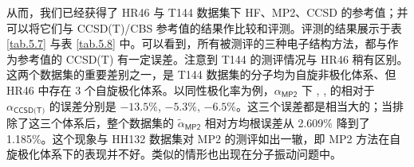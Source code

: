 \begin{table}[!th]
\centering
\caption[HF、MP2、CCSD 方法异性极化率的测评]{HF、MP2、CCSD 方法异性极化率的测评\textrm{\textsuperscript{\emph{a}}}。误差以相对方均根误差统计。}
\label{tab.5.8}
\end{table}

从而，我们已经获得了 HR46 与 T144 数据集下 HF、MP2、CCSD 的参考值；并可以将它们与 CCSD(T)/CBS 参考值的结果作比较和评测。评测的结果展示于表 \ref{tab.5.7} 与表 \ref{tab.5.8} 中。可以看到，所有被测评的三种电子结构方法，都与作为参考值的 CCSD(T) 有一定误差。注意到 T144 的测评情况与 HR46 稍有区别。这两个数据集的重要差别之一，是 T144 数据集的分子均为自旋非极化体系、但 HR46 中存在 3 个自旋极化体系。以同性极化率为例，$\alpha_\textsf{MP2}$ 下 , ,  的相对于 $\alpha_\textsf{CCSD(T)}$ 的误差分别是 $-13.5\%$, $-5.3\%$, $-6.5\%$。这三个误差都是相当大的；当排除了这三个体系后，整个数据集的 $\tilde \alpha_\textsf{MP2}$ 相对方均根误差从 2.609\% 降到了 1.185\%。这个现象与 HH132 数据集对 MP2 的测评如出一辙，即 MP2 方法在自旋极化体系下的表现并不好。类似的情形也出现在分子振动问题中\cite{Gu-Xu.JCTC.2021a}。

